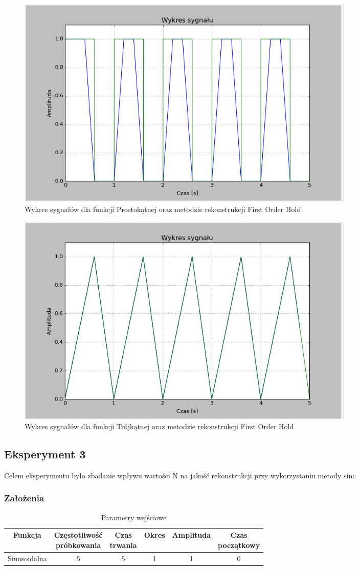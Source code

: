\documentclass{article}
\begin{document}
    \begin{figure}[h!]
        \centering
        \includegraphics[width=0.8\textwidth]{img/1/foh_rec.png}
        \caption{Wykres sygnałów dla funkcji Prostokątnej oraz metodzie rekonstrukcji First Order Hold}
    \end{figure}
    \FloatBarrier

    \begin{figure}[h!]
        \centering
        \includegraphics[width=0.8\textwidth]{img/1/foh_tri.png}
        \caption{Wykres sygnałów dla funkcji Trójkątnej oraz metodzie rekonstrukcji First Order Hold}
    \end{figure}
    \FloatBarrier

    \subsection{Eksperyment 3}
    Celem eksperymentu było zbadanie wpływu wartości N na jakość
    rekonstrukcji przy wykorzystaniu metody sinc

    \subsubsection{Założenia}
    \begin{table}[h!]
        \centering
        \begin{tabular}{|c|c|c|c|c|c|}
            \hline
            Funkcja & \shortstack{Częstotliwość\\ próbkowania} & \shortstack{Czas\\ trwania} & Okres & Amplituda & \shortstack{Czas\\ początkowy}  \\ \hline
            Sinusoidalna & 5 & 5 & 1 & 1 & 0  \\ \hline
        \end{tabular}
        \caption{Parametry wejściowe}
    \end{table}
    
\end{document}
